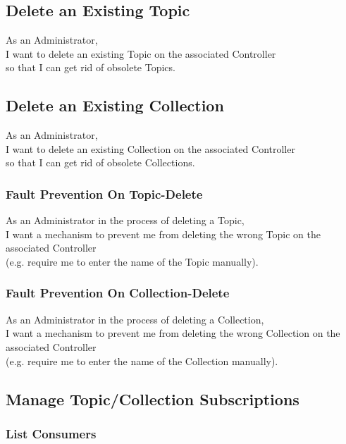 \subsection{Delete an Existing Topic}

As an Administrator,\\
I want to delete an existing Topic on the associated Controller\\
so that I can get rid of obsolete Topics.

\subsection{Delete an Existing Collection}

As an Administrator,\\
I want to delete an existing Collection on the associated Controller\\
so that I can get rid of obsolete Collections.


\subsubsection{Fault Prevention On Topic-Delete}

As an Administrator in the process of deleting a Topic, \\
I want a mechanism to prevent me from deleting the wrong Topic on the associated Controller\\
(e.g. require me to enter the name of the Topic manually).

\subsubsection{Fault Prevention On Collection-Delete}

As an Administrator in the process of deleting a Collection, \\
I want a mechanism to prevent me from deleting the wrong Collection on the associated Controller\\
(e.g. require me to enter the name of the Collection manually).


\subsection{Manage Topic/Collection Subscriptions}

\subsubsection{List Consumers}

